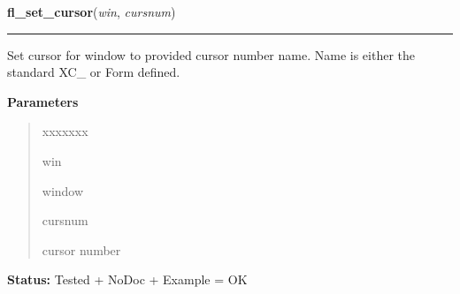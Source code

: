 \hspace{.8\funcindent}\begin{boxedminipage}{\funcwidth}

    \raggedright \textbf{fl\_set\_cursor}(\textit{win}, \textit{cursnum})

    \vspace{-1.5ex}

    \rule{\textwidth}{0.5\fboxrule}
\setlength{\parskip}{2ex}
    Set cursor for window to provided cursor number name. Name is either 
    the standard XC\_ or Form defined.

\setlength{\parskip}{1ex}
      \textbf{Parameters}
      \vspace{-1ex}

      \begin{quote}
        \begin{Ventry}{xxxxxxx}

          \item[win]

          window

          \item[cursnum]

          cursor number

        \end{Ventry}

      \end{quote}

\textbf{Status:} Tested + NoDoc + Example = OK



    \end{boxedminipage}

    \label{xformslib:library:fl_set_cursor_color}

    \vspace{0.5ex}

